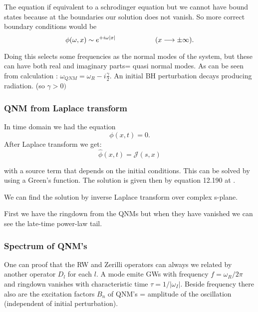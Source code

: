 \documentclass[12 pt]{article}
\begin{document}
The equation if equivalent to a schrodinger equation but we cannot have bound states because at the boundaries our solution does not vanish. So more correct boundary conditions would be 
\begin{equation}
	\phi(\omega,x) \sim e^{+i \omega |x|} \hspace{20mm} (x \longrightarrow \pm \infty).
\end{equation}

Doing this selects some frequencies as the normal modes of the system, but these can have both real and imaginary parts= quasi normal modes. As can be seen from calculation : $\omega_{QNM} = \omega_R - i \frac{\gamma}{2}$.
An initial BH perturbation decays producing radiation. (so $\gamma > 0)$

\subsubsection{QNM from Laplace transform}

In time domain we had the equation 
\begin{equation}
	[\partial_x^2 - \partial_t^2 - V(x)]\phi(x,t) = 0.
\end{equation}
After Laplace transform we get:
\begin{equation}
	[\partial_x^2 - s^2 - V(x)]\hat{\phi}(x,t) = \mathcal{J}(s,x)
\end{equation}

with a source term that depends on the initial conditions. This can be solved by using a Green's function. The solution is given then by equation 12.190 at \cite{maggiore}.

We can find the solution by inverse Laplace transform over complex s-plane. 

First we have the ringdown from the QNMs but when they have vanished we can see the late-time power-law tail. 

\subsubsection{Spectrum of QNM's}

One can proof that the RW and Zerilli operators can always we related by another operator $D_l$ for each $l$.
A mode emite GWs with frequency $f = \omega_R /2\pi$  and ringdown vanishes with characteristic time $\tau = 1/|\omega_I|$. Beside frequency there also are the excitation factors $B_n$ of QNM's = amplitude of the oscillation (independent of initial perturbation). 
\end{document}
